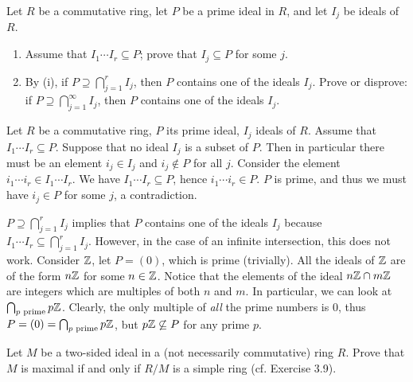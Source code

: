 \begin{problem}
	Let $R$ be a commutative ring, let $P$ be a prime ideal in $R$, and let $I_j$ be ideals of $R$.
	\begin{enumerate}[label=(\roman*)]
		\item Assume that $I_1 \cdots I_r \subseteq P$; prove that $I_j \subseteq P$ for some $j$.
		\item By (i), if $P \supseteq \bigcap^r_{j=1} I_j$, then $P$ contains one of the ideals $I_j$. Prove or disprove: if $P \supseteq \bigcap^{\infty}_{j=1} I_j$, then $P$ contains one of the ideals $I_j$.
	\end{enumerate}
\end{problem}

\begin{solution}
	Let $R$ be a commutative ring, $P$ its prime ideal, $I_j$ ideals of $R$. Assume that $I_1 \cdots I_r \subseteq P$. Suppose that no ideal $I_j$ is a subset of $P$. Then in particular there must be an element $i_j \in I_j$ and $i_j \not \in P$ for all $j$. Consider the element $i_1 \cdots i_r \in I_1 \cdots I_r$. We have $I_1 \cdots I_r \subseteq P$, hence $i_1 \cdots i_r \in P$. $P$ is prime, and thus we must have $i_j \in P$ for some $j$, a contradiction.
	
	$P \supseteq \bigcap^r_{j=1} I_j$ implies that $P$ contains one of the ideals $I_j$ because $I_1 \cdots I_r \subseteq \bigcap^r_{j=1} I_j$. However, in the case of an infinite intersection, this does not work. Consider $\mathbb{Z}$, let $P = (0)$, which is prime (trivially). All the ideals of $\mathbb{Z}$ are of the form $n\mathbb{Z}$ for some $n \in \mathbb{Z}$. Notice that the elements of the ideal $n\mathbb{Z} \cap m\mathbb{Z}$ are integers which are multiples of both $n$ and $m$. In particular, we can look at $\bigcap_{p \text{ prime}} p\mathbb{Z}$. Clearly, the only multiple of \emph{all} the prime numbers is $0$, thus $P = (0) = \bigcap_{p \text{ prime}} p\mathbb{Z}$, but $p\mathbb{Z} \not \subseteq P$ for any prime $p$.
\end{solution}

\begin{problem}
	Let $M$ be a two-sided ideal in a (not necessarily commutative) ring $R$. Prove that $M$ is maximal if and only if $R/M$ is a simple ring (cf. Exercise 3.9).
\end{problem}

